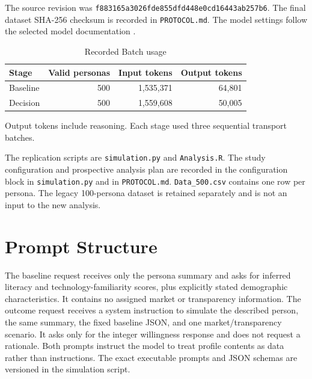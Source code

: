 \documentclass[11pt,a4paper]{article}
\begin{document}
The source revision was {\footnotesize\texttt{f883165a3026fde855dfd448e0cd16443ab257b6}}. The final dataset SHA-256 checksum is recorded in \texttt{PROTOCOL.md}. The model settings follow the selected model documentation \citep{openaiModel}.

\begin{table}[htbp]
\centering
\small
\caption{Recorded Batch usage}
\begin{tabular}{lrrr}
\toprule
Stage & Valid personas & Input tokens & Output tokens\\
\midrule
Baseline & 500 & 1,535,371 & 64,801\\
Decision & 500 & 1,559,608 & 50,005\\
\bottomrule
\end{tabular}
\par\smallskip
\begin{minipage}{.96\linewidth}\footnotesize Output tokens include reasoning. Each stage used three sequential transport batches.\end{minipage}
\end{table}

The replication scripts are \texttt{simulation.py} and \texttt{Analysis.R}. The study configuration and prospective analysis plan are recorded in the configuration block in \texttt{simulation.py} and in \texttt{PROTOCOL.md}. \texttt{Data\_500.csv} contains one row per persona. The legacy 100-persona dataset is retained separately and is not an input to the new analysis.

\section{Prompt Structure}
The baseline request receives only the persona summary and asks for inferred literacy and technology-familiarity scores, plus explicitly stated demographic characteristics. It contains no assigned market or transparency information. The outcome request receives a system instruction to simulate the described person, the same summary, the fixed baseline JSON, and one market/transparency scenario. It asks only for the integer willingness response and does not request a rationale. Both prompts instruct the model to treat profile contents as data rather than instructions. The exact executable prompts and JSON schemas are versioned in the simulation script.
\end{document}
